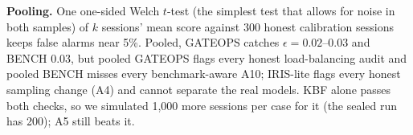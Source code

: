 \textbf{Pooling.} One one-sided Welch $t$-test (the simplest test that allows for noise in both
samples) of $k$ sessions' mean score against 300 honest calibration sessions keeps false alarms near
5\%. Pooled, GATEOPS catches $\epsilon = 0.02$--$0.03$ and BENCH 0.03, but pooled GATEOPS flags every
honest load-balancing audit and pooled BENCH misses every benchmark-aware A10; IRIS-lite flags every
honest sampling change (A4) and cannot separate the real models. KBF alone passes both checks, so we
simulated 1,000 more sessions per case for it (the sealed run has 200); A5 still beats it.
